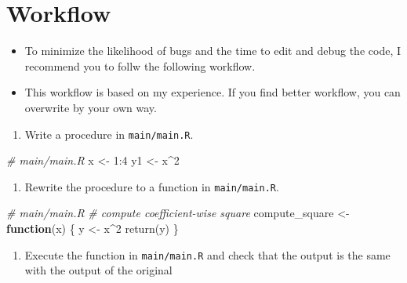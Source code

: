 \documentclass[
]{book}
\newenvironment{Shaded}{\begin{snugshade}}{\end{snugshade}}
\newcommand{\CommentTok}[1]{\textcolor[rgb]{0.56,0.35,0.01}{\textit{#1}}}
\newcommand{\ControlFlowTok}[1]{\textcolor[rgb]{0.13,0.29,0.53}{\textbf{#1}}}
\newcommand{\DecValTok}[1]{\textcolor[rgb]{0.00,0.00,0.81}{#1}}
\newcommand{\FunctionTok}[1]{\textcolor[rgb]{0.00,0.00,0.00}{#1}}
\newcommand{\NormalTok}[1]{#1}
\newcommand{\OtherTok}[1]{\textcolor[rgb]{0.56,0.35,0.01}{#1}}
\newcommand{\SpecialCharTok}[1]{\textcolor[rgb]{0.00,0.00,0.00}{#1}}
\providecommand{\tightlist}{%
  \setlength{\itemsep}{0pt}\setlength{\parskip}{0pt}}
\begin{document}
\hypertarget{workflow}{%
\section{Workflow}\label{workflow}}

\begin{itemize}
\tightlist
\item
  To minimize the likelihood of bugs and the time to edit and debug the code, I recommend you to follw the following workflow.
\item
  This workflow is based on my experience. If you find better workflow, you can overwrite by your own way.
\end{itemize}

\begin{enumerate}
\def\labelenumi{\arabic{enumi}.}
\tightlist
\item
  Write a procedure in \texttt{main/main.R}.
\end{enumerate}

\begin{Shaded}
\begin{Highlighting}[]
\CommentTok{\# main/main.R}
\NormalTok{x }\OtherTok{\textless{}{-}} \DecValTok{1}\SpecialCharTok{:}\DecValTok{4}
\NormalTok{y1 }\OtherTok{\textless{}{-}}\NormalTok{ x}\SpecialCharTok{\^{}}\DecValTok{2}
\end{Highlighting}
\end{Shaded}

\begin{enumerate}
\def\labelenumi{\arabic{enumi}.}
\setcounter{enumi}{1}
\tightlist
\item
  Rewrite the procedure to a function in \texttt{main/main.R}.
\end{enumerate}

\begin{Shaded}
\begin{Highlighting}[]
\CommentTok{\# main/main.R}
\CommentTok{\# compute coefficient{-}wise square}
\NormalTok{compute\_square }\OtherTok{\textless{}{-}}
  \ControlFlowTok{function}\NormalTok{(x) \{}
\NormalTok{    y }\OtherTok{\textless{}{-}}\NormalTok{ x}\SpecialCharTok{\^{}}\DecValTok{2}
    \FunctionTok{return}\NormalTok{(y)}
\NormalTok{  \}}
\end{Highlighting}
\end{Shaded}

\begin{enumerate}
\def\labelenumi{\arabic{enumi}.}
\setcounter{enumi}{2}
\tightlist
\item
  Execute the function in \texttt{main/main.R} and check that the output is the same with the output of the original
\end{enumerate}
\end{document}
